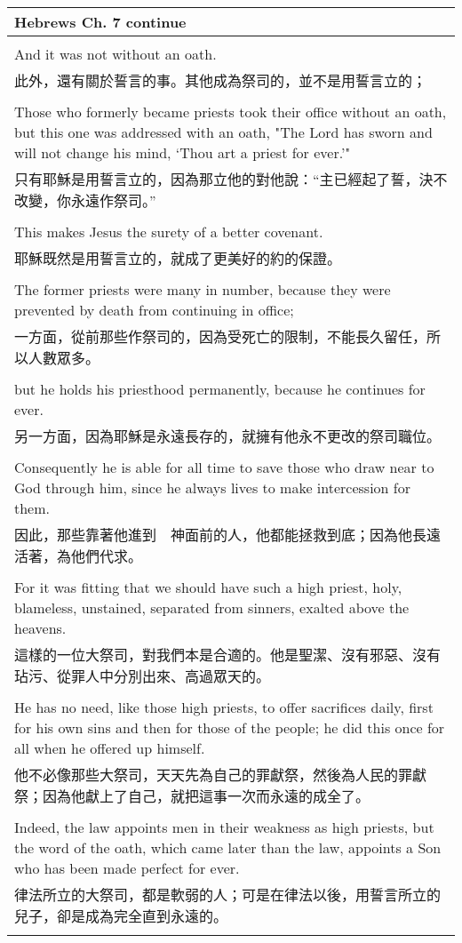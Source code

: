 \newpage
\begin{tabularx}{\textwidth}{p{}}
\hline
Hebrews Ch. 7 continue \\
\hline \\
And it was not without an oath. \\
此外，還有關於誓言的事。其他成為祭司的，並不是用誓言立的； \\ \\
Those who formerly became priests took their office without an oath, but this one was addressed with an oath, "The Lord has sworn and will not change his mind, `Thou art a priest for ever.'" \\
只有耶穌是用誓言立的，因為那立他的對他說：“主已經起了誓，決不改變，你永遠作祭司。” \\ \\
This makes Jesus the surety of a better covenant. \\
耶穌既然是用誓言立的，就成了更美好的約的保證。 \\ \\
The former priests were many in number, because they were prevented by death from continuing in office; \\
一方面，從前那些作祭司的，因為受死亡的限制，不能長久留任，所以人數眾多。 \\ \\
but he holds his priesthood permanently, because he continues for ever. \\
另一方面，因為耶穌是永遠長存的，就擁有他永不更改的祭司職位。 \\ \\
Consequently he is able for all time to save those who draw near to God through him, since he always lives to make intercession for them. \\
因此，那些靠著他進到　神面前的人，他都能拯救到底；因為他長遠活著，為他們代求。 \\ \\
For it was fitting that we should have such a high priest, holy, blameless, unstained, separated from sinners, exalted above the heavens. \\
這樣的一位大祭司，對我們本是合適的。他是聖潔、沒有邪惡、沒有玷污、從罪人中分別出來、高過眾天的。 \\ \\
He has no need, like those high priests, to offer sacrifices daily, first for his own sins and then for those of the people; he did this once for all when he offered up himself. \\
他不必像那些大祭司，天天先為自己的罪獻祭，然後為人民的罪獻祭；因為他獻上了自己，就把這事一次而永遠的成全了。 \\ \\
Indeed, the law appoints men in their weakness as high priests, but the word of the oath, which came later than the law, appoints a Son who has been made perfect for ever. \\
律法所立的大祭司，都是軟弱的人；可是在律法以後，用誓言所立的兒子，卻是成為完全直到永遠的。 \\ \\

\hline
\end{tabularx}

